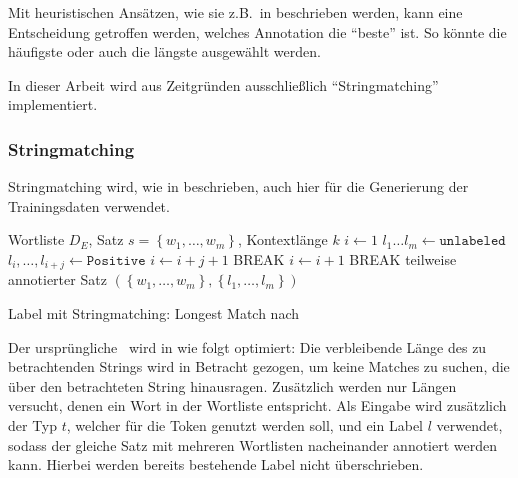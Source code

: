Mit heuristischen Ansätzen,
wie sie z.B.\, in \autocite{1906.01378}
beschrieben werden,
kann eine Entscheidung getroffen werden,
welches Annotation die \enquote{beste} ist.
So könnte die häufigste oder auch die längste ausgewählt werden.

In dieser Arbeit wird aus Zeitgründen ausschließlich \enquote{Stringmatching} implementiert.

\subsubsection{Stringmatching}
\label{ssec:stringmatching}

Stringmatching wird,
wie in  beschrieben,
auch hier für die Generierung der Trainingsdaten verwendet.

\begin{algorithm}
	\begin{tcolorbox}[talgostyle]
		\begin{algorithmic}
			\Require Wortliste $D_E$, Satz $s = \left\lbrace w_1, \hdots, w_m \right\rbrace$, Kontextlänge $k$
			\State $i \gets 1$
			\State $l_1 \hdots l_m \gets \texttt{unlabeled} $
			\State $l_i, \hdots, l_{i+j}  \gets \texttt{Positive} $
			\State $i \gets i+j+1$
			\State BREAK
			\EndIf
			\State $i \gets i + 1$
			\State BREAK
			\EndIf
			\EndFor
			\EndWhile
			\Return teilweise annotierter Satz $\left(
				\left\lbrace
				w_1, \hdots, w_m
				\right\rbrace,
				\left\lbrace
				l_1, \hdots, l_m
				\right\rbrace
				\right)$
		\end{algorithmic}
	\end{tcolorbox}
	\caption{Label mit Stringmatching: Longest Match nach \autocite{1906.01378}}%
	\label{alg:stringmatching:longestmatch}
\end{algorithm}

Der ursprüngliche~
wird in 
wie folgt optimiert:
Die verbleibende Länge des zu betrachtenden Strings wird in Betracht gezogen,
um keine Matches zu suchen,
die über den betrachteten String hinausragen.
Zusätzlich werden nur Längen versucht,
denen ein Wort in der Wortliste entspricht.
Als Eingabe wird zusätzlich der Typ $t$,
welcher für die Token genutzt werden soll,
und ein Label $l$ verwendet,
sodass der gleiche Satz mit mehreren Wortlisten nacheinander annotiert werden kann.
Hierbei werden bereits bestehende Label nicht überschrieben.

